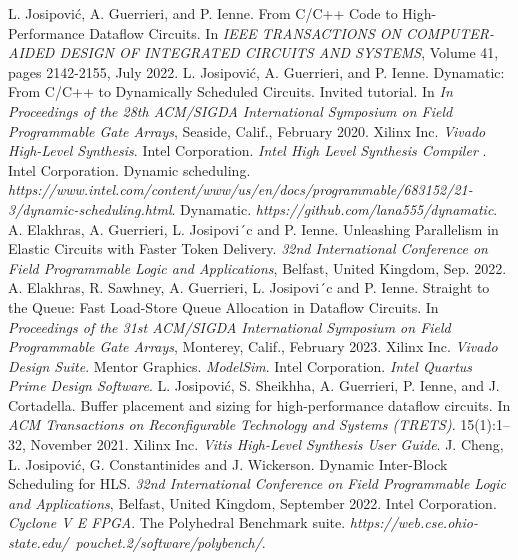\documentclass[final,5p,times,twocolumn]{elsarticle}
\begin{document}
\begin{spacing}{1.125}

\begin{thebibliography}{00}


 L. Josipović, A. Guerrieri, and P. Ienne. From C/C++ Code to High-Performance Dataflow Circuits. In \textit{IEEE TRANSACTIONS ON COMPUTER-AIDED DESIGN OF INTEGRATED CIRCUITS AND SYSTEMS}, Volume 41, pages 2142-2155, July 2022.
 L. Josipović, A. Guerrieri, and P. Ienne. Dynamatic: From C/C++ to Dynamically Scheduled Circuits. Invited tutorial. In \textit{In Proceedings of the 28th ACM/SIGDA International Symposium on Field Programmable Gate Arrays}, Seaside, Calif., February 2020.
 Xilinx Inc. \textit{Vivado High-Level Synthesis}.
 Intel Corporation. \textit{Intel High Level Synthesis Compiler }.
 Intel Corporation. Dynamic scheduling. \textit{https://www.intel.com/content/www/us/en/docs/programmable/683152/21-3/dynamic-scheduling.html}.
 Dynamatic. \textit{https://github.com/lana555/dynamatic}.
 A. Elakhras, A. Guerrieri, L. Josipovi´c and P. Ienne. Unleashing Parallelism in Elastic Circuits with Faster Token Delivery. \textit{32nd International Conference on Field Programmable Logic and Applications}, Belfast, United Kingdom, Sep. 2022.
 A. Elakhras,  R. Sawhney, A. Guerrieri, L. Josipovi´c and P. Ienne. Straight to the Queue: Fast Load-Store Queue Allocation in Dataflow Circuits. In \textit{Proceedings of the 31st ACM/SIGDA International Symposium on Field Programmable Gate Arrays}, Monterey, Calif., February 2023. 
 Xilinx Inc. \textit{Vivado Design Suite}.
 Mentor Graphics. \textit{ModelSim}.
 Intel Corporation. \textit{Intel Quartus Prime Design Software}.
 L. Josipović, S. Sheikhha, A. Guerrieri, P. Ienne, and J. Cortadella. Buffer placement and sizing for high-performance dataflow circuits. In \textit{ACM Transactions on Reconfigurable Technology and Systems (TRETS)}. 15(1):1–32, November 2021.
 Xilinx Inc. \textit{Vitis High-Level Synthesis User Guide}.
 J. Cheng, L. Josipović, G. Constantinides and J. Wickerson. Dynamic Inter-Block Scheduling for HLS. \textit{32nd International Conference on Field Programmable Logic and Applications}, Belfast, United Kingdom, September 2022.
 Intel Corporation. \textit{Cyclone V E FPGA}.
 The Polyhedral Benchmark suite. \textit{https://web.cse.ohio-state.edu/~pouchet.2/software/polybench/}.

\end{thebibliography}

\end{spacing}
\end{document}
